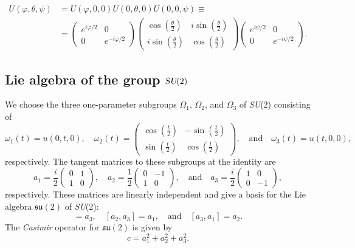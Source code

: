 \documentclass[12pt]{amsart}
\def\su2{\textsl{SU}(2)}
\def\lasu2{\mathfrak{su}(2)}
\theoremstyle{definition}
\theoremstyle{remark}
\numberwithin{equation}{section}
\begin{document}
\begin{equation}
	\begin{split}
	U(\varphi, \theta, \psi) &= U(\varphi, 0, 0)U(0, \theta, 0)U(0, 0, \psi) \equiv \\
	&= \begin{pmatrix}e^{i\varphi/2} & 0 \\ 0 & e^{-i\varphi/2}\end{pmatrix}\begin{pmatrix} \cos\left(\frac{\theta}{2}\right)& i\sin\left(\frac{\theta}{2}\right)\\ i\sin\left(\frac{\theta}{2}\right) & \cos\left(\frac{\theta}{2}\right)\end{pmatrix}\begin{pmatrix}e^{i\psi/2} & 0 \\ 0 & e^{-i\psi/2}\end{pmatrix}.
	\end{split}
\end{equation}



\subsection{Lie algebra of the group $\textsl{SU}(2)$}
We choose the three one-parameter subgroups $\Omega_1$, $\Omega_2$, and $\Omega_3$ of \su2 consisting of
\begin{equation}
	\omega_1(t) = u(0,t,0), \quad \omega_2(t) = \begin{pmatrix} \cos\left(\frac{t}{2}\right)& -\sin\left(\frac{t}{2}\right)\\ \sin\left(\frac{t}{2}\right) & \cos\left(\frac{t}{2}\right)\end{pmatrix}, \quad \text{and} \quad \omega_3(t) = u(t, 0, 0),
\end{equation}
respectively. The tangent matrices to these subgroups at the identity are
\begin{equation}
	a_1 = \frac{i}{2}\begin{pmatrix} 0& 1\\ 1 & 0\end{pmatrix}, \quad a_2 = \frac{1}{2}\begin{pmatrix} 0& -1\\ 1 & 0\end{pmatrix}, \quad \text{and} \quad a_3 = \frac{i}{2}\begin{pmatrix} 1 & 0\\ 0 & -1\end{pmatrix},
\end{equation}
respectively. These matrices are linearly independent and give a basis for the Lie algebra $\lasu2$ of \su2:
\begin{equation}
	[a_1, a_2] = a_3, \quad [a_2, a_3] = a_1, \quad \text{and} \quad [a_3, a_1] = a_2.
\end{equation}
The \emph{Casimir} operator for $\lasu2$ is given by
\begin{equation}
	c = a_1^2 + a_2^2 +a_3^2.
\end{equation}
\end{document}
